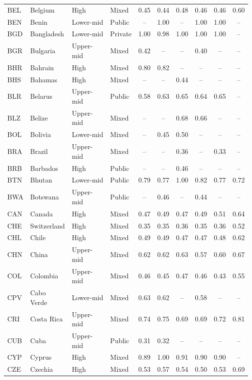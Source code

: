 \documentclass[11pt,letterpaper]{article}
\begin{document}
\begin{longtable}{@{}llllcccccc@{}}
BEL & Belgium & High & Mixed & 0.45 & 0.44 & 0.48 & 0.46 & 0.46 & 0.60 \\
BEN & Benin & Lower-mid & Public & -- & 1.00 & -- & 1.00 & 1.00 & -- \\
BGD & Bangladesh & Lower-mid & Private & 1.00 & 0.98 & 1.00 & 1.00 & 1.00 & -- \\
BGR & Bulgaria & Upper-mid & Mixed & 0.42 & -- & -- & 0.40 & -- & -- \\
BHR & Bahrain & High & Mixed & 0.80 & 0.82 & -- & -- & -- & -- \\
BHS & Bahamas & High & Mixed & -- & -- & 0.44 & -- & -- & -- \\
BLR & Belarus & Upper-mid & Public & 0.58 & 0.63 & 0.65 & 0.64 & 0.65 & -- \\
BLZ & Belize & Upper-mid & Mixed & -- & -- & 0.68 & 0.66 & -- & -- \\
BOL & Bolivia & Lower-mid & Mixed & -- & 0.45 & 0.50 & -- & -- & -- \\
BRA & Brazil & Upper-mid & Mixed & -- & -- & 0.36 & -- & 0.33 & -- \\
BRB & Barbados & High & Public & -- & -- & 0.46 & -- & -- & -- \\
BTN & Bhutan & Lower-mid & Public & 0.79 & 0.77 & 1.00 & 0.82 & 0.77 & 0.72 \\
BWA & Botswana & Upper-mid & Public & -- & 0.46 & -- & 0.44 & -- & -- \\
CAN & Canada & High & Mixed & 0.47 & 0.49 & 0.47 & 0.49 & 0.51 & 0.64 \\
CHE & Switzerland & High & Mixed & 0.35 & 0.35 & 0.36 & 0.35 & 0.36 & 0.52 \\
CHL & Chile & High & Mixed & 0.49 & 0.49 & 0.47 & 0.47 & 0.48 & 0.62 \\
CHN & China & Upper-mid & Mixed & 0.62 & 0.62 & 0.63 & 0.57 & 0.60 & 0.67 \\
COL & Colombia & Upper-mid & Mixed & 0.46 & 0.45 & 0.47 & 0.46 & 0.43 & 0.55 \\
CPV & Cabo Verde & Lower-mid & Mixed & 0.63 & 0.62 & -- & 0.58 & -- & -- \\
CRI & Costa Rica & Upper-mid & Mixed & 0.74 & 0.75 & 0.69 & 0.69 & 0.72 & 0.81 \\
CUB & Cuba & Upper-mid & Public & 0.31 & 0.32 & -- & -- & -- & -- \\
CYP & Cyprus & High & Mixed & 0.89 & 1.00 & 0.91 & 0.90 & 0.90 & -- \\
CZE & Czechia & High & Mixed & 0.53 & 0.57 & 0.54 & 0.50 & 0.53 & 0.69 \\

\end{longtable}
\end{document}
